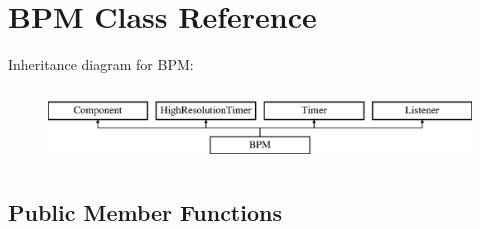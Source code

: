 \hypertarget{class_b_p_m}{}\section{B\+PM Class Reference}
\label{class_b_p_m}
Inheritance diagram for B\+PM\+:\begin{figure}[H]
\begin{center}
\leavevmode
\includegraphics[height=2.000000cm]{class_b_p_m}
\end{center}
\end{figure}
\subsection*{Public Member Functions}
